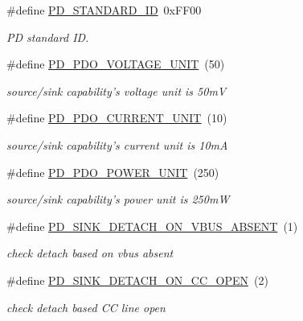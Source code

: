 \begin{DoxyCompactItemize}
\#define \hyperlink{group__usb__pd__stack_ga6d970ee2c757411a31911430bb94c722}{P\-D\-\_\-\-S\-T\-A\-N\-D\-A\-R\-D\-\_\-\-I\-D}~0x\-F\-F00
\begin{DoxyCompactList}\small\item\em P\-D standard I\-D. \end{DoxyCompactList}\item 
\#define \hyperlink{group__usb__pd__stack_ga83cbb5a0a1b721ddb0f815077c854e8e}{P\-D\-\_\-\-P\-D\-O\-\_\-\-V\-O\-L\-T\-A\-G\-E\-\_\-\-U\-N\-I\-T}~(50)
\begin{DoxyCompactList}\small\item\em source/sink capability's voltage unit is 50m\-V \end{DoxyCompactList}\item 
\#define \hyperlink{group__usb__pd__stack_ga63746ad31eee8f5912a846952e6645b6}{P\-D\-\_\-\-P\-D\-O\-\_\-\-C\-U\-R\-R\-E\-N\-T\-\_\-\-U\-N\-I\-T}~(10)
\begin{DoxyCompactList}\small\item\em source/sink capability's current unit is 10m\-A \end{DoxyCompactList}\item 
\#define \hyperlink{group__usb__pd__stack_ga18642aa62f457d8501be4bddf6608e80}{P\-D\-\_\-\-P\-D\-O\-\_\-\-P\-O\-W\-E\-R\-\_\-\-U\-N\-I\-T}~(250)
\begin{DoxyCompactList}\small\item\em source/sink capability's power unit is 250m\-W \end{DoxyCompactList}\item 
\#define \hyperlink{group__usb__pd__stack_ga26ae67c195a653e3fa00d94551e85381}{P\-D\-\_\-\-S\-I\-N\-K\-\_\-\-D\-E\-T\-A\-C\-H\-\_\-\-O\-N\-\_\-\-V\-B\-U\-S\-\_\-\-A\-B\-S\-E\-N\-T}~(1)
\begin{DoxyCompactList}\small\item\em check detach based on vbus absent \end{DoxyCompactList}\item 
\#define \hyperlink{group__usb__pd__stack_ga6bc66a3ddfbafaa7313db800f351d968}{P\-D\-\_\-\-S\-I\-N\-K\-\_\-\-D\-E\-T\-A\-C\-H\-\_\-\-O\-N\-\_\-\-C\-C\-\_\-\-O\-P\-E\-N}~(2)
\begin{DoxyCompactList}\small\item\em check detach based C\-C line open \end{DoxyCompactList}\end{DoxyCompactItemize}
